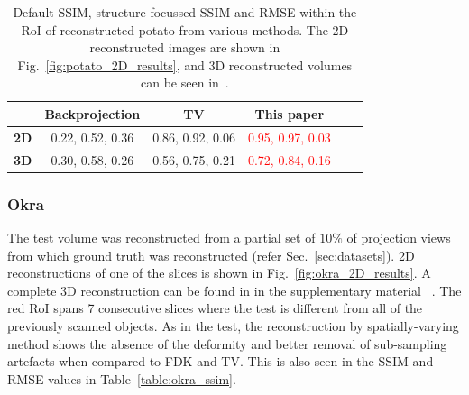 \documentclass[journal]{IEEEtran}
\begin{document}
\begin{table}[!h]
  \centering
  \caption{Default-SSIM, structure-focussed SSIM and RMSE within the RoI of reconstructed potato from various
    methods. 
The 2D reconstructed images are shown in Fig.~\ref{fig:potato_2D_results}, and 3D reconstructed volumes can be seen in~\cite{supp_paper}.}
\begin{tabular}{|l|c|c|c|c|c|}
\hline &
\textbf{Backprojection} & \textbf{TV} &
\textbf{This paper} \\ \hline \textbf{2D} & 0.22, 0.52, 0.36
& 0.86, 0.92, 0.06 & \textcolor{red}{0.95, 0.97, 0.03} \\ \hline \textbf{3D} & 0.30, 0.58, 0.26 & 0.56, 0.75, 0.21 & \textcolor{red}{0.72, 0.84, 0.16}
\\ \hline
\end{tabular}
\label{table:potato_ssim}
\end{table}

\subsubsection{\textbf{Okra}}
\label{Sec:okra_spatially_varying}
The test volume was reconstructed from a partial set of $10\%$ of projection views from which
ground truth was reconstructed (refer Sec.~\ref{sec:datasets}). 2D reconstructions of one of the
slices is shown in Fig.~\ref{fig:okra_2D_results}. A complete 3D
reconstruction can be found in in the supplementary material
~\cite{supp_paper}. The red RoI spans 7 consecutive slices where the
test is different from all of the previously scanned objects. %
As in the test, the
reconstruction by spatially-varying method shows the absence of the
deformity and better removal of sub-sampling artefacts when compared
to FDK and TV. This is also seen in the SSIM and RMSE values in
Table~\ref{table:okra_ssim}. 
\end{document}
